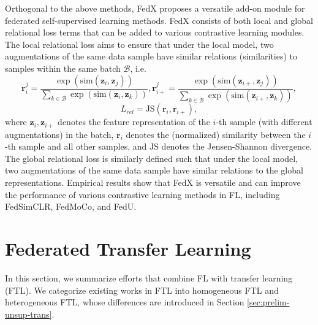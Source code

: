 \documentclass[11pt]{article}
\begin{document}
Orthogonal to the above methods, FedX \cite{Yilun-han2022fedx} proposes a versatile add-on module for federated self-supervised learning methods. FedX consists of both local and global relational loss terms that can be added to various contrastive learning modules. The local relational loss aims to ensure that under the local model, two augmentations of the same data sample have similar relations (similarities) to samples within the same batch $\mathcal{B}$, i.e.
\begin{equation}
        \mathbf{r}_i^j = \frac{\exp(\mathrm{sim}(\mathbf{z}_i, \mathbf{z}_j))}{\sum_{k\in\mathcal{B}}\exp(\mathrm{sim}(\mathbf{z}_i, \mathbf{z}_k))}, \mathbf{r}_{i+}^{j} = \frac{\exp(\mathrm{sim}(\mathbf{z}_{i+}, \mathbf{z}_j))}{\sum_{k\in\mathcal{B}}\exp(\mathrm{sim}(\mathbf{z}_{i+}, \mathbf{z}_k))},
\end{equation}
\begin{equation}
        L_{rel} = \mathrm{JS}(\mathbf{r}_i, \mathbf{r}_{i+}),
\end{equation}
where $\mathbf{z}_i, \mathbf{z}_{i+}$ denotes the feature representation of the $i$-th sample (with different augmentations) in the batch, $\mathbf{r}_i$ denotes the (normalized) similarity between the $i$-th sample and all other samples, and $\mathrm{JS}$ denotes the Jensen-Shannon divergence. The global relational loss is similarly defined such that under the local model, two augmentations of the same data sample have similar relations to the global representations. Empirical results show that FedX is versatile and can improve the performance of various contrastive learning methods in FL, including FedSimCLR, FedMoCo, and FedU.



\section{Federated Transfer Learning}
\label{sec:fed-utl}
In this section, we summarize efforts that combine FL with transfer learning (FTL). We categorize existing works in FTL into homogeneous FTL and heterogeneous FTL, whose differences are introduced in Section \ref{sec:prelim-unsup-trans}.
\end{document}
